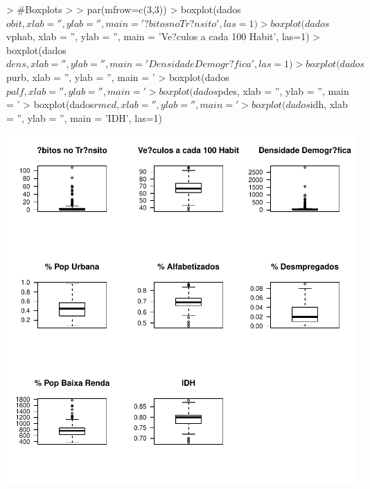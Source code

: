 \documentclass[a4paper]{article} %
\begin{document}
\begin{Schunk}
\begin{Sinput}
> #Boxplots
> 
> par(mfrow=c(3,3))
> boxplot(dados$obit, xlab = '', ylab = '', main = '?bitos no Tr?nsito', las=1)
> boxplot(dados$vphab, xlab = '', ylab = '', main = 'Ve?culos a cada 100 Habit', las=1)
> boxplot(dados$dens, xlab = '', ylab = '', main = 'Densidade Demogr?fica', las=1)
> boxplot(dados$purb, xlab = '', ylab = '', main = '%
> boxplot(dados$palf, xlab = '', ylab = '', main = '%
> boxplot(dados$pdes, xlab = '', ylab = '', main = '%
> boxplot(dados$rmed, xlab = '', ylab = '', main = '%
> boxplot(dados$idh, xlab = '', ylab = '', main = 'IDH', las=1)
\end{Sinput}
\end{Schunk}
\includegraphics{count1-003}
\end{document}

